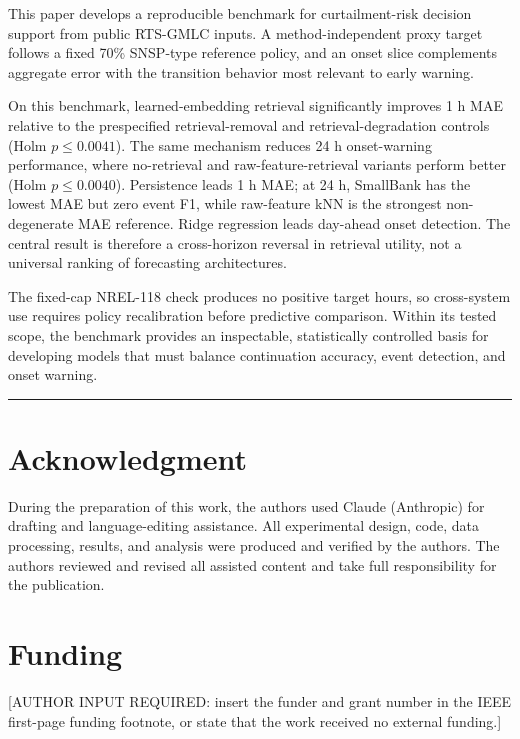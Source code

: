 \documentclass[
  10pt,
  a4paper,
]{article}
\begin{document}
This paper develops a reproducible benchmark for curtailment-risk
decision support from public RTS-GMLC inputs. A method-independent proxy target follows
a fixed 70\% SNSP-type reference policy, and an onset slice complements
aggregate error with the transition behavior most relevant to early
warning.

On this benchmark, learned-embedding retrieval significantly improves 1
h MAE relative to the prespecified retrieval-removal and
retrieval-degradation controls (Holm \(p\leq0.0041\)). The same
mechanism reduces 24 h onset-warning performance, where no-retrieval and
raw-feature-retrieval variants perform better (Holm \(p\leq0.0040\)).
Persistence leads 1 h MAE; at 24 h, SmallBank has the lowest MAE but zero
event F1, while raw-feature kNN is the strongest non-degenerate MAE
reference. Ridge regression leads day-ahead onset detection. The central result is therefore a
cross-horizon reversal in retrieval utility, not a universal ranking of
forecasting architectures.

The fixed-cap NREL-118 check produces no positive target hours, so
cross-system use requires policy recalibration before predictive
comparison. Within its tested scope, the benchmark provides an inspectable,
statistically controlled basis for developing models that must balance
continuation accuracy, event detection, and onset warning.

\begin{center}\rule{0.5\linewidth}{0.5pt}\end{center}

\section{Acknowledgment}\label{acknowledgment}

During the preparation of this work, the authors used Claude (Anthropic)
for drafting and language-editing assistance. All experimental design,
code, data processing, results, and analysis were produced and verified
by the authors. The authors reviewed and revised all assisted content
and take full responsibility for the publication.

\section{Funding}\label{funding}

{[}AUTHOR INPUT REQUIRED: insert the funder and grant number in the IEEE
first-page funding footnote, or state that the work received no external
funding.{]}
\end{document}
